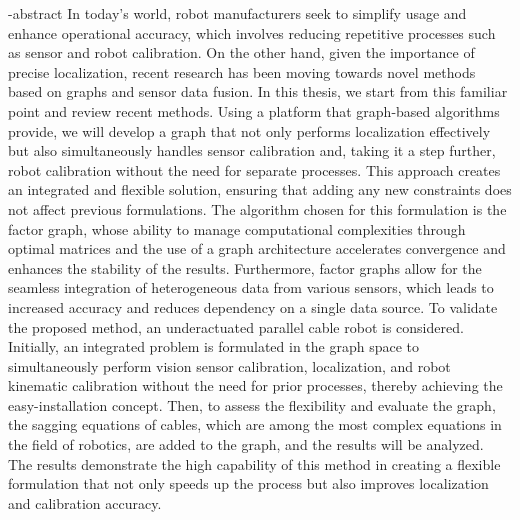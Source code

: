 
\en-abstract{
In today's world, robot manufacturers seek to simplify usage and enhance operational accuracy, which involves reducing repetitive processes such as sensor and robot calibration. On the other hand, given the importance of precise localization, recent research has been moving towards novel methods based on graphs and sensor data fusion.
In this thesis, we start from this familiar point and review recent methods. Using a platform that graph-based algorithms provide, we will develop a graph that not only performs localization effectively but also simultaneously handles sensor calibration and, taking it a step further, robot calibration without the need for separate processes. This approach creates an integrated and flexible solution, ensuring that adding any new constraints does not affect previous formulations.
The algorithm chosen for this formulation is the factor graph, whose ability to manage computational complexities through optimal matrices and the use of a graph architecture accelerates convergence and enhances the stability of the results. Furthermore, factor graphs allow for the seamless integration of heterogeneous data from various sensors, which leads to increased accuracy and reduces dependency on a single data source.
To validate the proposed method, an underactuated parallel cable robot is considered. Initially, an integrated problem is formulated in the graph space to simultaneously perform vision sensor calibration, localization, and robot kinematic calibration without the need for prior processes, thereby achieving the easy-installation concept. Then, to assess the flexibility and evaluate the graph, the sagging equations of cables, which are among the most complex equations in the field of robotics, are added to the graph, and the results will be analyzed. The results demonstrate the high capability of this method in creating a flexible formulation that not only speeds up the process but also improves localization and calibration accuracy.
}
